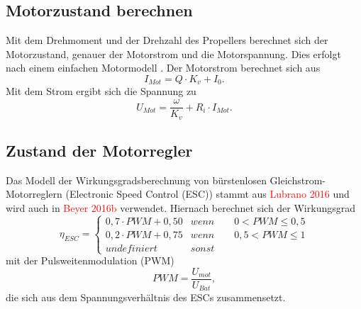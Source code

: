 \subsection{Motorzustand berechnen}
Mit dem Drehmoment und der Drehzahl des Propellers berechnet sich der Motorzustand, genauer der Motorstrom und die Motorspannung. Dies erfolgt nach einem einfachen Motormodell \cite{Drela.2007}.
Der Motorstrom berechnet sich aus 
\begin{equation}
	I_{Mot} = Q\cdot K_v + I_0. \label{eq:motorstrom}
\end{equation}
Mit dem Strom ergibt sich die Spannung zu
\begin{equation}
	U_{Mot} = \frac{\omega}{K_v} + R_i\cdot I_{Mot}. \label{eq:motorspannung}
\end{equation}


\subsection{Zustand der Motorregler}
Das Modell der Wirkungsgradsberechnung von bürstenlosen Gleichstrom-Motorreglern (Electronic Speed Control (ESC)) stammt aus \textcolor{red}{Lubrano 2016} und wird auch in \textcolor{red}{Beyer 2016b} verwendet. Hiernach berechnet sich der Wirkungsgrad 
\begin{equation}
\eta_{ESC} = \begin{cases} 
0,7\cdot PWM + 0,50 & wenn \qquad 0 < PWM \leq 0,5 \\ 
0,2\cdot PWM + 0,75 & wenn \qquad 0,5 < PWM \leq 1 \\ 
undefiniert & sonst 
\end{cases}
\end{equation} 
mit der Pulsweitenmodulation (PWM) 
\begin{equation}
	PWM = \frac{U_{mot}}{U_{Bat}},
\end{equation}
die sich aus dem Spannungsverhältnis des ESCs zusammensetzt.


